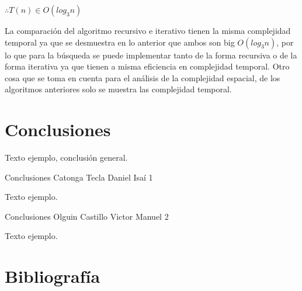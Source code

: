 \documentclass[12pt,twoside]{article}
\begin{document}
\begin{center}
  $\therefore T(n)\in O(log_3n)$
\end{center}

La comparación del algoritmo recursivo e iterativo tienen la misma complejidad temporal ya que se desmuestra en lo anterior que ambos son
big $O(log_3n)$, por lo que para la búsqueda se puede implementar tanto de la forma recursiva o de la forma iterativa ya que tienen a misma eficiencia
en complejidad temporal. Otro cosa que se toma en cuenta para el análisis de la complejidad espacial, de los algoritmos anteriores solo se muestra
las complejidad temporal.

\newpage
\newpage
\section{Conclusiones}

Texto ejemplo, conclusión general.
\medskip

Conclusiones Catonga Tecla Daniel Isaí 1
\par
Texto ejemplo.

\medskip

Conclusiones Olguin Castillo Victor Manuel 2
\par
Texto ejemplo.

\newpage
\section{Bibliograf\'ia}

\printbibliography[title={ }]
\end{document}
